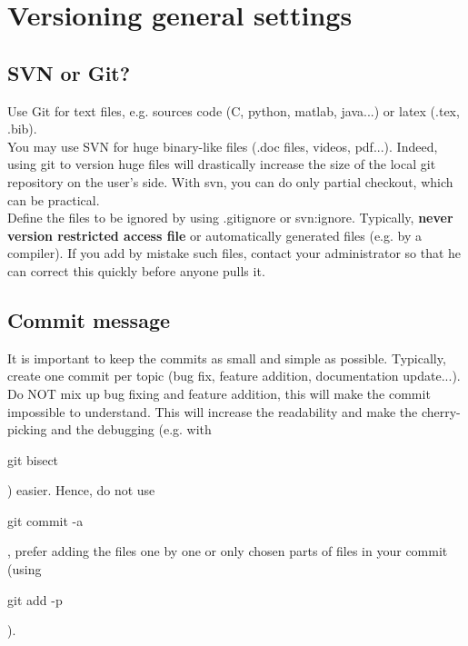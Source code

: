 \chapter{Versioning general settings}


\section{SVN or Git?}
Use Git for text files, e.g. sources code (C, python, matlab, java...) or latex (.tex, .bib).\\
You may use SVN for huge binary-like files (.doc files, videos, pdf...). 
Indeed, using git to version huge files will drastically increase the size of the local git repository on the user's side. With svn, you can do only partial checkout, which can be practical.\\

Define the files to be ignored by using .gitignore or svn:ignore. 
Typically, \textbf{never version restricted access file} or automatically generated files (e.g. by a compiler).
If you add by mistake such files, contact your administrator so that he can correct this quickly before anyone pulls it.

%

\section{Commit message}

It is important to keep the commits as small and simple as possible.
Typically, create one commit per topic (bug fix, feature addition,  documentation update...).
Do NOT mix up bug fixing and feature addition, this will make the commit impossible to understand.
This will increase the readability and make the cherry-picking and the debugging (e.g. with \begin{tt}git bisect\end{tt}) easier.
Hence, do not use \begin{tt}git commit -a\end{tt}, prefer adding the files one by one or only chosen parts of files in your commit (using \begin{tt}git add -p\end{tt}).

